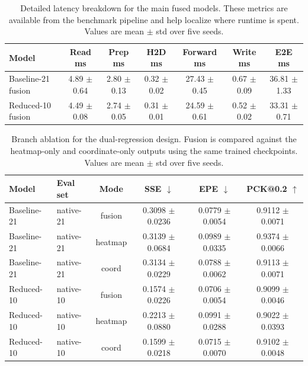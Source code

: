 \documentclass[10pt,letterpaper]{article}
\begin{document}
\begin{table}[H]
\centering
\footnotesize
\caption{Detailed latency breakdown for the main fused models. These metrics are available from the benchmark pipeline and help localize where runtime is spent. Values are mean $\pm$ std over five seeds.}
\label{tab:latency_breakdown}
\begin{tabular}{lcccccc}
\toprule
Model & Read ms & Prep ms & H2D ms & Forward ms & Write ms & E2E ms \\
\midrule
Baseline-21 fusion & 4.89 $\pm$ 0.64 & 2.80 $\pm$ 0.13 & 0.32 $\pm$ 0.02 & 27.43 $\pm$ 0.45 & 0.67 $\pm$ 0.09 & 36.81 $\pm$ 1.33 \\
Reduced-10 fusion & 4.49 $\pm$ 0.08 & 2.74 $\pm$ 0.05 & 0.31 $\pm$ 0.01 & 24.59 $\pm$ 0.61 & 0.52 $\pm$ 0.02 & 33.31 $\pm$ 0.71 \\
\bottomrule
\end{tabular}
\end{table}

\begin{table}[H]
\centering
\footnotesize
\caption{Branch ablation for the dual-regression design. Fusion is compared against the heatmap-only and coordinate-only outputs using the same trained checkpoints. Values are mean $\pm$ std over five seeds.}
\label{tab:branch_ablation}
\begin{tabular}{llcccc}
\toprule
Model & Eval set & Mode & SSE $\downarrow$ & EPE $\downarrow$ & PCK@0.2 $\uparrow$ \\
\midrule
Baseline-21 & native-21 & fusion & 0.3098 $\pm$ 0.0236 & 0.0779 $\pm$ 0.0054 & 0.9112 $\pm$ 0.0071 \\
Baseline-21 & native-21 & heatmap & 0.3139 $\pm$ 0.0684 & 0.0989 $\pm$ 0.0335 & 0.9374 $\pm$ 0.0066 \\
Baseline-21 & native-21 & coord & 0.3134 $\pm$ 0.0229 & 0.0788 $\pm$ 0.0062 & 0.9113 $\pm$ 0.0071 \\
Reduced-10 & native-10 & fusion & 0.1574 $\pm$ 0.0226 & 0.0706 $\pm$ 0.0054 & 0.9099 $\pm$ 0.0046 \\
Reduced-10 & native-10 & heatmap & 0.2213 $\pm$ 0.0880 & 0.0991 $\pm$ 0.0288 & 0.9022 $\pm$ 0.0393 \\
Reduced-10 & native-10 & coord & 0.1599 $\pm$ 0.0218 & 0.0715 $\pm$ 0.0070 & 0.9102 $\pm$ 0.0048 \\
\bottomrule
\end{tabular}
\end{table}
\end{document}
